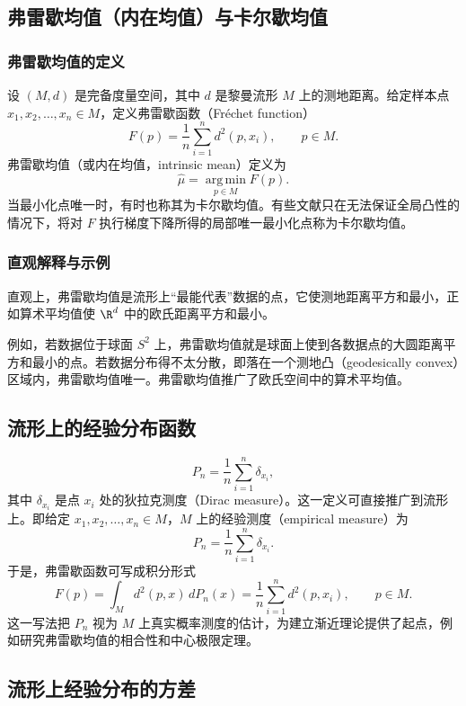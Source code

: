 \subsection{弗雷歇均值（内在均值）与卡尔歇均值}

\subsubsection{弗雷歇均值的定义}

设 $(M,d)$ 是完备度量空间，其中 $d$ 是黎曼流形 $M$ 上的测地距离。给定样本点 $x_1,x_2,\ldots,x_n\in M$，定义弗雷歇函数（Fréchet function）
\[
  F(p)=\frac{1}{n}\sum_{i=1}^{n}d^2(p,x_i),\qquad p\in M.
\]
弗雷歇均值（或内在均值，intrinsic mean）定义为
\[
  \hat\mu=\operatorname*{arg\,min}_{p\in M} F(p).
\]
当最小化点唯一时，有时也称其为卡尔歇均值。有些文献只在无法保证全局凸性的情况下，将对 $F$ 执行梯度下降所得的局部唯一最小化点称为卡尔歇均值。

\subsubsection{直观解释与示例}

直观上，弗雷歇均值是流形上“最能代表”数据的点，它使测地距离平方和最小，正如算术平均值使 $\R^d$ 中的欧氏距离平方和最小。

例如，若数据位于球面 $S^2$ 上，弗雷歇均值就是球面上使到各数据点的大圆距离平方和最小的点。若数据分布得不太分散，即落在一个测地凸（geodesically convex）区域内，弗雷歇均值唯一。弗雷歇均值推广了欧氏空间中的算术平均值。

\subsection{流形上的经验分布函数}

\[
  P_n=\frac{1}{n}\sum_{i=1}^{n}\delta_{x_i},
\]
其中 $\delta_{x_i}$ 是点 $x_i$ 处的狄拉克测度（Dirac measure）。这一定义可直接推广到流形上。即给定 $x_1,x_2,\ldots,x_n\in M$，$M$ 上的经验测度（empirical measure）为
\[
  P_n=\frac{1}{n}\sum_{i=1}^{n}\delta_{x_i}.
\]
于是，弗雷歇函数可写成积分形式
\[
  F(p)=\int_M d^2(p,x)\,dP_n(x)
      =\frac{1}{n}\sum_{i=1}^{n}d^2(p,x_i),\qquad p\in M.
\]
这一写法把 $P_n$ 视为 $M$ 上真实概率测度的估计，为建立渐近理论提供了起点，例如研究弗雷歇均值的相合性和中心极限定理。

\subsection{流形上经验分布的方差}

